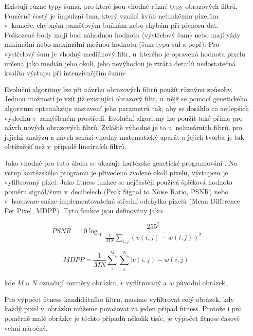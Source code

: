 Existují různé typy šumů, pro které jsou vhodné různé typy obrazových filtrů. Poměrně častý je impulzní šum, který vzniká kvůli nefunkčním pixelům v~kameře, chybným paměťovým buňkám nebo chybám při přenosu dat. Poškozené body mají buď náhodnou hodnotu (výstřelový šum) nebo mají vždy minimální nebo maximální možnou hodnotu (šum typu sůl a pepř). Pro výstřelový šum je vhodný mediánový filtr, u~kterého je opravená hodnota pixelu určena jako medián jeho okolí, jeho nevýhodou je ztráta detailů nedostatečná kvalita výstupu při intenzivnějším šumu-

Evoluční algoritmy lze při návrhu obrazových filtrů použít různými způsoby. Jednou možností je vzít již existující obrazový filtr, u~nějž se pomocí genetického algoritmu optimalizuje nastavení jeho parametrů tak, aby se dosáhlo co nejlepších výsledků v~zamýšleném prostředí. Evoluční algoritmy lze použít také přímo pro návrh nových obrazových filtrů. Zvláště výhodné je to u~nelineárních filtrů, pro jejichž analýzu a návrh schází vhodný matematický aparát a jejich tvorba je tak obtížnější než v~případě lineárních filtrů.

Jako vhodné pro tuto úlohu se ukazuje kartézské genetické programování \cite{ZelenaIF}. Na vstup kartézského programu je přivedeno zvolené okolí pixelu, výstupem je vyfiltrovaný pixel. Jako fitness funkce se nejčastěji používá špičková hodnota poměru signál/šum v~decibelech (Peak Signal to Noise Ratio, PSNR) nebo v~hardware snáze implementovatelná střední odchylka pixelů (Mean Difference Per Pixel, MDPP). Tyto funkce jsou definovány jako:

\begin{equation}
    \label{eqPSNR}
    \mathit{PSNR} = 10 \log_{10} \frac{255^2}{\frac{1}{MN} \sum\limits_{i,j} \left( v\left( i, j \right) - w\left( i, j \right)  \right)^2 }
\end{equation}

\begin{equation}
    \label{eqMDPP}
    \mathit{MDPP} = \frac{1}{MN} \sum\limits_i^M \sum\limits_j^N \left| v\left( i, j \right) - w\left( i, j \right) \right|
\end{equation}

\noindent{}kde $M$ a $N$ označují rozměry obrázku, $v$ vyfiltrovaný a $w$ původní obrázek.

Pro výpočet fitness kandidátního filtru, musíme vyfiltrovat celý obrázek, kdy každý pixel v~obrázku můžeme považovat za jeden případ fitness. Protože i pro poměrně malé obrázky je těchto případů několik tisíc, je výpočet fitness časově velmi náročný.

